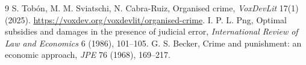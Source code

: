 \documentclass[11pt]{article}
\theoremstyle{definition}
\begin{document}
\begin{thebibliography}{9}
 S. Tob\'on, M. M. Sviatschi, N. Cabra-Ruiz, Organised crime, \emph{VoxDevLit} 17(1) (2025). \url{https://voxdev.org/voxdevlit/organised-crime}.
 I. P. L. Png, Optimal subsidies and damages in the presence of judicial error, \emph{International Review of Law and Economics} 6 (1986), 101--105.
 G. S. Becker, Crime and punishment: an economic approach, \emph{JPE} 76 (1968), 169--217.
\end{thebibliography}
\end{document}
